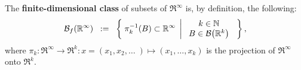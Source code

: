 \begin{definition}
\label{RInfinityFiniteDimensionalClass}
\mbox{}\vskip 0.1cm
\noindent
The \textbf{finite-dimensional class} of subsets
of $\Re^{\infty}$ is, by definition, the following:
\begin{equation*}
\mathcal{B}_{f}(\mathbb{R}^{\infty})
\;\; := \;\;
\left\{\;
\pi_{k}^{-1}\!\left(B\right) \subset \mathbb{R}^{\infty}
\;\left\vert\;
\begin{array}{c}
k \in \mathbb{N}
\\
B \in \mathcal{B}\!\left(\mathbb{R}^{k}\right)
\end{array}
\right.
\;\right\},
\end{equation*}
where $\pi_{k} : \Re^{\infty} \longrightarrow \Re^{k} : x = (x_{1},x_{2},\ldots\;) \longmapsto (x_{1},\ldots,x_{k})$
is the projection of $\Re^{\infty}$ onto $\Re^{k}$.
\end{definition}


